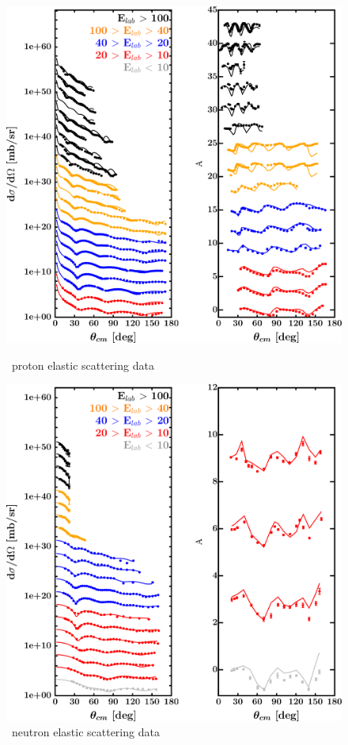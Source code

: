 \begin{figure}[H]
    \centering
    \begin{minipage}{0.45\textwidth}
        \centering
        \includegraphics[width=1.0\textwidth]{figures/ca40_protonElastic.png}
        \caption{\caForty\ proton elastic scattering data}
        \label{DOMFitData_ca40_proton_elastic}
    \end{minipage}\hfill
    \begin{minipage}{0.45\textwidth}
        \centering
        \includegraphics[width=1.0\textwidth]{figures/ca40_neutronElastic.png}
        \caption{\caForty\ neutron elastic scattering data}
        \label{DOMFitData_ca40_neutron_elastic}
    \end{minipage}
\end{figure}

